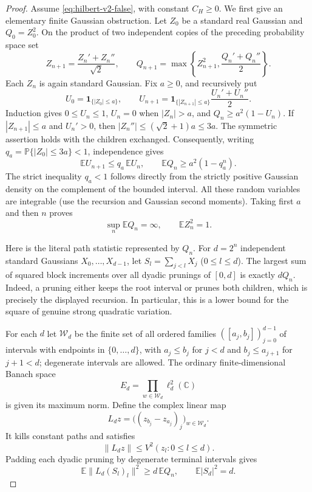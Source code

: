 \documentclass[11pt]{article}
\numberwithin{equation}{section}
\theoremstyle{remark}
\theoremstyle{definition}
\begin{document}
\begin{proof}
Assume \eqref{eq:hilbert-v2-false}, with constant $C_H\ge0$.
We first give an elementary finite Gaussian obstruction.  Let $Z_0$ be a
standard real Gaussian and $Q_0=Z_0^2$.  On the product of two independent
copies of the preceding probability space set
\[
 Z_{n+1}=\frac{Z_n'+Z_n''}{\sqrt2},\qquad
 Q_{n+1}=\max\!\left\{Z_{n+1}^2,\frac{Q_n'+Q_n''}{2}\right\}.
\]
Each $Z_n$ is again standard Gaussian.  Fix $a\ge0$, and recursively put
\[
 U_0=\mathbf1_{\{|Z_0|\le a\}},\qquad
 U_{n+1}=\mathbf1_{\{|Z_{n+1}|\le a\}}
             \frac{U_n'+U_n''}{2}.
\]
Induction gives $0\le U_n\le1$, $U_n=0$ when $|Z_n|>a$, and
$Q_n\ge a^2(1-U_n)$.  If $|Z_{n+1}|\le a$ and $U_n'>0$, then
$|Z_n''|\le(\sqrt2+1)a\le3a$.  The symmetric assertion holds with the
children exchanged.  Consequently, writing
$q_a=\mathbb P\{|Z_0|\le3a\}<1$, independence gives
\[
 \mathbb E U_{n+1}\le q_a\,\mathbb E U_n,\qquad
 \mathbb E Q_n\ge a^2(1-q_a^n).
\]
The strict inequality $q_a<1$ follows directly from the strictly positive
Gaussian density on the complement of the bounded interval.  All these
random variables are integrable (use the recursion and Gaussian second
moments).  Taking first $a$ and then $n$ proves
\begin{equation}\label{eq:finite-gaussian-dyadic-unbounded}
 \sup_n\mathbb E Q_n=\infty,
 \qquad \mathbb E Z_n^2=1.
\end{equation}

Here is the literal path statistic represented by $Q_n$.  For $d=2^n$
independent standard Gaussians $X_0,\ldots,X_{d-1}$, let
$S_l=\sum_{j<l}X_j$ ($0\le l\le d$).  The largest sum of squared block
increments over all dyadic prunings of $[0,d]$ is exactly $dQ_n$.
Indeed, a pruning either keeps the root interval or prunes both children,
which is precisely the displayed recursion.  In particular, this is a
lower bound for the square of genuine strong quadratic variation.

For each $d$ let $\mathcal W_d$ be the finite set of all ordered families
$([a_j,b_j])_{j=0}^{d-1}$ of intervals with endpoints in
$\{0,\ldots,d\}$, with $a_j\le b_j$ for $j<d$ and $b_j\le a_{j+1}$ for
$j+1<d$; degenerate intervals are allowed.  The ordinary finite-dimensional Banach space
\[
 E_d=\prod_{w\in\mathcal W_d}\ell^2_d(\mathbb C)
\]
is given its maximum norm.  Define the complex linear map
\[
 L_dz=\bigl((z_{b_j}-z_{a_j})_j\bigr)_{w\in\mathcal W_d}.
\]
It kills constant paths and satisfies
\begin{equation}\label{eq:finite-D-coordinate-control}
 \|L_dz\|\le V^2(z_l:0\le l\le d).
\end{equation}
Padding each dyadic pruning by degenerate terminal intervals gives
\begin{equation}\label{eq:gaussian-finite-Banach-lower}
 \mathbb E\|L_d(S_l)_l\|^2\ge d\,\mathbb E Q_n,
 \qquad \mathbb E|S_d|^2=d.
\end{equation}


\end{proof}
\end{document}
